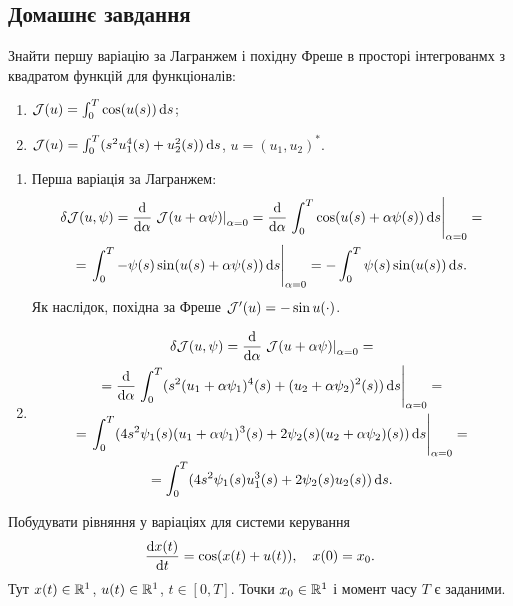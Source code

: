 \subsection{Домашнє завдання}

\begin{problem}
	Знайти першу варіацію за Лагранжем і похідну Фреше в просторі інтегрованмх з квадратом функцій для функціоналів:
	\begin{enumerate}
		\item $\mathcal{J}(u) = \int_0^T \cos(u(s)) \mathop{}\!\mathrm{d} s$;
		\item $\mathcal{J}(u) = \int_0^T (s^2 u_1^4(s) + u_2^2(s)) \mathop{}\!\mathrm{d} s$, $u=(u_1,u_2)^*$.
	\end{enumerate}
\end{problem}

\begin{solution}
	\begin{enumerate}
		\item Перша варіація за Лагранжем:
		\begin{multline*} 
			\delta \mathcal{J}(u, \psi) = \frac{\mathop{}\!\mathrm{d}}{\mathop{}\!\mathrm{d} \alpha} \left.\mathcal{J}(u + \alpha \psi)\right|_{\alpha = 0} = \frac{\mathop{}\!\mathrm{d}}{\mathop{}\!\mathrm{d} \alpha} \left.\int_0^T \cos(u(s) + \alpha \psi(s)) \mathop{}\!\mathrm{d} s\right|_{\alpha = 0} = \\
			= \left.\int_0^T - \psi(s) \sin(u(s) + \alpha \psi(s)) \mathop{}\!\mathrm{d} s\right|_{\alpha = 0} = - \int_0^T \psi(s) \sin(u(s)) \mathop{}\!\mathrm{d} s.
		\end{multline*}
		Як наслідок, похідна за Фреше $\mathcal{J}'(u) = - \sin u(\cdot)$.

		\item \begin{multline*} 
			\delta \mathcal{J}(u, \psi) = \frac{\mathop{}\!\mathrm{d}}{\mathop{}\!\mathrm{d} \alpha} \left.\mathcal{J}(u + \alpha \psi)\right|_{\alpha = 0} = \\
			= \frac{\mathop{}\!\mathrm{d}}{\mathop{}\!\mathrm{d} \alpha} \left.\int_0^T (s^2 (u_1 + \alpha \psi_1)^4(s) + (u_2 + \alpha \psi_2)^2(s)) \mathop{}\!\mathrm{d} s\right|_{\alpha = 0} = \\
			= \left.\int_0^T (4 s^2 \psi_1(s) (u_1 + \alpha \psi_1)^3(s) + 2 \psi_2(s) (u_2 + \alpha \psi_2)(s)) \mathop{}\!\mathrm{d} s\right|_{\alpha = 0} = \\
			= \int_0^T (4 s^2 \psi_1(s) u_1^3(s) + 2 \psi_2(s) u_2 (s)) \mathop{}\!\mathrm{d} s.
		\end{multline*}
	\end{enumerate}
\end{solution}

\begin{problem}
	Побудувати рівняння у варіаціях для системи керування \[ \frac{\mathop{}\!\mathrm{d} x(t)}{\mathop{}\!\mathrm{d} t} = \cos(x(t) + u(t)), \quad x(0) = x_0. \] Тут $x(t)\in\mathbb{R}^1$, $u(t)\in\mathbb{R}^1$, $t\in[0,T]$. Точки $x_0\in\mathbb{R}^1$ і момент часу $T$ є заданими.
\end{problem}


